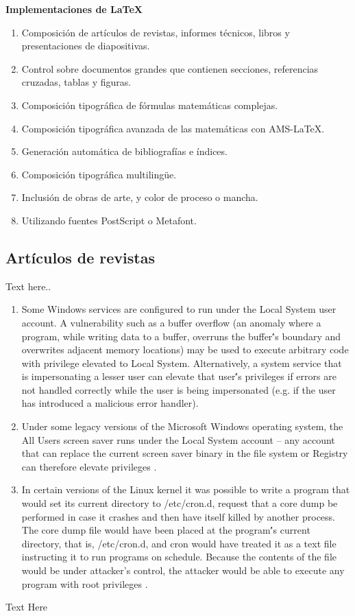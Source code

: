\documentclass[letterpaper, 10pt, journal]{IEEEtran}
\begin{document}
\newline
\textbf{Implementaciones de \LaTeX}
\begin{enumerate}
    \item Composici\'on de art\'iculos de revistas, informes t\'ecnicos, libros y presentaciones de diapositivas.
    \item Control sobre documentos grandes que contienen secciones, referencias cruzadas, tablas y figuras.
    \item Composici\'on tipogr\'afica de f\'ormulas matem\'aticas complejas.
    \item Composici\'on tipogr\'afica avanzada de las matem\'aticas con AMS-LaTeX.
    \item Generaci\'on autom\'atica de bibliograf\'ias e \'indices.
    \item Composici\'on tipogr\'afica multiling\"ue.
    \item Inclusi\'on de obras de arte, y color de proceso o mancha.
    \item Utilizando fuentes PostScript o Metafont.
\end{enumerate}


\subsection{Art\'iculos de revistas}
Text here..
\begin{enumerate}
\item	Some Windows services are configured to run under the Local System user account. A vulnerability such as a buffer overflow (an anomaly where a program, while writing data to a buffer, overruns the buffer\''s boundary and overwrites adjacent memory locations) may be used to execute arbitrary code with privilege elevated to Local System. Alternatively, a system service that is impersonating a lesser user can elevate that user\''s privileges if errors are not handled correctly while the user is being impersonated (e.g. if the user has introduced a malicious error handler)\cite{[6]}.
\item	Under some legacy versions of the Microsoft Windows operating system, the All Users screen saver runs under the Local System account – any account that can replace the current screen saver binary in the file system or Registry can therefore elevate privileges \cite{[6]}.
\item	In certain versions of the Linux kernel it was possible to write a program that would set its current directory to /etc/cron.d, request that a core dump be performed in case it crashes and then have itself killed by another process. The core dump file would have been placed at the program\''s current directory, that is, /etc/cron.d, and cron would have treated it as a text file instructing it to run programs on schedule. Because the contents of the file would be under attacker’s control, the attacker would be able to execute any program with root privileges \cite{[3]}.
\end{enumerate}
Text Here
\end{document}
